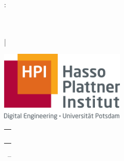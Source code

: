 \newenvironment{myepigraph}
  {\par\hfill
   \begin{tabular}{@{}r@{\hspace{13em}}}}
  {\end{tabular}\par\medskip}

\begin{titlepage}

\begin{addmargin}[-1cm]{-3cm}
\begin{center}
\large

\hfill
\vfill


\begingroup
  \color{Maroon}\spacedallcaps{\myTitle}:\\
  \color{Maroon}\spacedallcaps{\mySubtitle}\\[1em]
  \color{Black}\spacedlowsmallcaps{\myGermanTitle}\\[3em]
\endgroup

{
\color{Black}
 | \spacedlowsmallcaps{\myName}\\
\spacedlowsmallcaps{\myTime}
}

\vfill

\includegraphics[width=6cm]{gfx/hpi_logo.jpg} \\[2ex]
\begin{myepigraph}
    \spacedlowsmallcaps{Supervised by}\\[1.1em]
    \myProf\\
    \mySupervisorA\\
    \mySupervisorB\\[1.5em]
    \spacedlowsmallcaps{\myFaculty}
\end{myepigraph}

\myTime\ -- \myVersion %

\vfill

\end{center}
\end{addmargin}

\end{titlepage}
